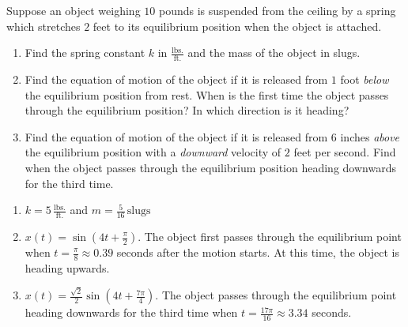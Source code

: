 { Suppose an object weighing $10$ pounds is suspended from the ceiling by a spring which stretches $2$ feet to its equilibrium position when the object is attached.  
\begin{enumerate}
\item   Find the spring constant $k$ in $\frac{\text{lbs.}}{\text{ft.}}$ and the mass of the object in slugs. 
\item   Find the equation of motion of the object if it is released from $1$ foot \textit{below} the equilibrium position from rest.  When is the first time the object passes through the equilibrium position? In which direction is it heading? 
\item   Find the equation of motion of the object if it is released from $6$ inches \textit{above} the equilibrium position with a \textit{downward} velocity of $2$ feet per second.  Find when the object passes through the equilibrium position heading downwards for the third time.
\end{enumerate}}
{\begin{enumerate} 
\item $k = 5 \, \frac{\text{lbs.}}{\text{ft.}}$ and $m = \frac{5}{16} \, \text{slugs}$ 
\item  $x(t) = \sin\left(4t + \frac{\pi}{2}\right)$.  The object first passes through the equilibrium point when $t = \frac{\pi}{8} \approx 0.39$ seconds after the motion starts.  At this time, the object is heading upwards. 
\item  $x(t) = \frac{\sqrt{2}}{2} \sin\left(4t + \frac{7\pi}{4}\right)$.  The object passes through the equilibrium point heading downwards for the third time when $t = \frac{17\pi}{16} \approx 3.34$ seconds. 
\end{enumerate}}